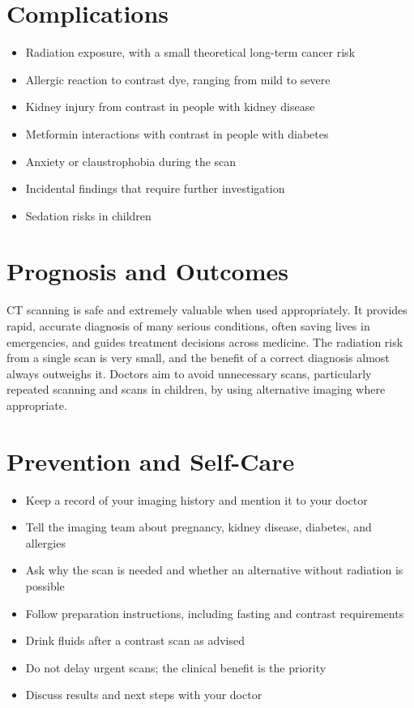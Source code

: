 \section*{Complications}
\begin{itemize}
    \item Radiation exposure, with a small theoretical long-term cancer risk
    \item Allergic reaction to contrast dye, ranging from mild to severe
    \item Kidney injury from contrast in people with kidney disease
    \item Metformin interactions with contrast in people with diabetes
    \item Anxiety or claustrophobia during the scan
    \item Incidental findings that require further investigation
    \item Sedation risks in children
\end{itemize}

\section*{Prognosis and Outcomes}
CT scanning is safe and extremely valuable when used appropriately. It provides rapid, accurate diagnosis of many serious conditions, often saving lives in emergencies, and guides treatment decisions across medicine. The radiation risk from a single scan is very small, and the benefit of a correct diagnosis almost always outweighs it. Doctors aim to avoid unnecessary scans, particularly repeated scanning and scans in children, by using alternative imaging where appropriate.

\section*{Prevention and Self-Care}
\begin{itemize}
    \item Keep a record of your imaging history and mention it to your doctor
    \item Tell the imaging team about pregnancy, kidney disease, diabetes, and allergies
    \item Ask why the scan is needed and whether an alternative without radiation is possible
    \item Follow preparation instructions, including fasting and contrast requirements
    \item Drink fluids after a contrast scan as advised
    \item Do not delay urgent scans; the clinical benefit is the priority
    \item Discuss results and next steps with your doctor
\end{itemize}

